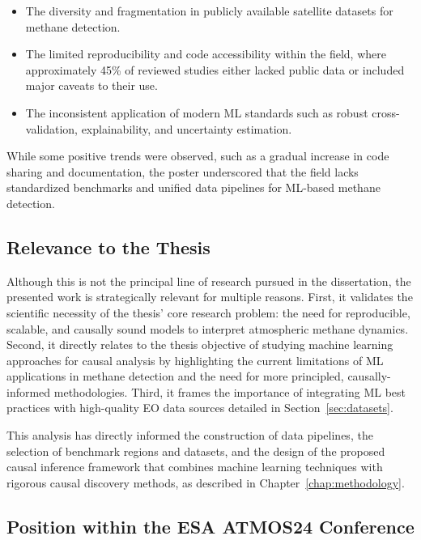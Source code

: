 
\begin{itemize}
	\item The diversity and fragmentation in publicly available satellite datasets for methane detection.
	\item The limited reproducibility and code accessibility within the field, where approximately 45\% of reviewed studies either lacked public data or included major caveats to their use.
	\item The inconsistent application of modern ML standards such as robust cross-validation, explainability, and uncertainty estimation.
\end{itemize}

While some positive trends were observed, such as a gradual increase in code sharing and documentation, the poster underscored that the field lacks standardized benchmarks and unified data pipelines for ML-based methane detection.

\subsection{Relevance to the Thesis}

Although this is not the principal line of research pursued in the dissertation, the presented work is strategically relevant for multiple reasons. First, it validates the scientific necessity of the thesis' core research problem: the need for reproducible, scalable, and causally sound models to interpret atmospheric methane dynamics. Second, it directly relates to the thesis objective of studying machine learning approaches for causal analysis by highlighting the current limitations of ML applications in methane detection and the need for more principled, causally-informed methodologies. Third, it frames the importance of integrating ML best practices with high-quality EO data sources detailed in Section~\ref{sec:datasets}.

This analysis has directly informed the construction of data pipelines, the selection of benchmark regions and datasets, and the design of the proposed causal inference framework that combines machine learning techniques with rigorous causal discovery methods, as described in Chapter~\ref{chap:methodology}.

\subsection{Position within the ESA ATMOS24 Conference}

